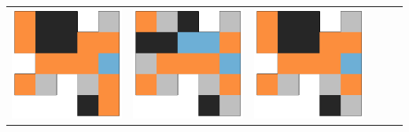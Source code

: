\begin{tabular}{cccccc}
    \hline \rule{0pt}{9ex}  
    \includegraphics[scale=0.1]{images/top_designs/walker/ga/ga6_gen29_ind0} &
    \includegraphics[scale=0.1]{images/top_designs/walker/ga/ga6_gen29_ind1} &
    \includegraphics[scale=0.1]{images/top_designs/walker/ga/ga6_gen29_ind2} &

\end{tabular}

